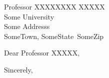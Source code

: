 \documentclass[12pt]{VTletter}
\date{\today}
\begin{document}
%
%
%
\begin{letter}{ 
			   Professor XXXXXXXX XXXXX\\ 
               Some University\\ 
               Some Addresss\\ 
               SomeTown, SomeState~SomeZip
               }


%
\opening{Dear Professor XXXXX,}

%
\lipsum[1-10]


\closing{Sincerely,}




\end{letter}
\end{document}
